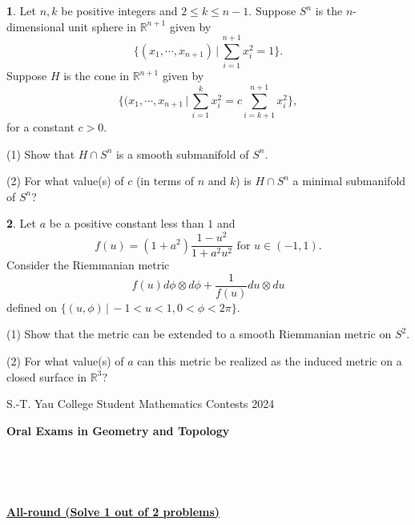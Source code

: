 \documentclass[12pt,a4paper]{amsart}
\theoremstyle{definition}
\newtheorem{problem}{}
\begin{document}
\begin{problem}
Let $n, k$ be positive integers and $2\leq k\leq n-1$. Suppose $S^n$
is the $n$-dimensional unit sphere in $\mathbb R^{n+1}$ given by
\[\{ (x_1, \cdots, x_{n+1})\,|\, \sum_{i=1}^{n+1} x_i^2=1\}.\]
Suppose $H$ is the cone in $\mathbb R^{n+1}$
 given by \[\{(x_1, \cdots, x_{n+1}\,|\,\sum_{i=1}^k x_i^2=c\sum_{i=k+1}^{n+1} x_i^2\},\] for a constant $c>0$.

(1) Show that $H\cap S^n$ is a smooth submanifold of $S^n$.

(2) For what value(s) of  $c$ (in terms of $n$ and $k$) is $H\cap
S^n$ a minimal submanifold of $S^n$?
\end{problem}



\begin{problem}
Let $a$ be a positive constant less than $1$ and
\[f(u)=(1+a^2)\frac{1-u^2}{1+a^2 u^2} \text{ for } u\in (-1, 1).\]
Consider the Riemmanian metric \[f(u)d\phi\otimes
d\phi+\frac{1}{f(u)}du\otimes du\] defined on $\{(u, \phi)\,|\,
-1<u<1, 0<\phi<2\pi\}$.

(1) Show that the metric can be extended to a smooth Riemmanian
metric on $S^2$.

(2) For what value(s) of  $a$  can this metric be realized as the
induced metric on a closed surface in $\mathbb R^3$?
\end{problem}



\newpage

\begin{center}
S.-T. Yau College Student Mathematics Contests 2024\\

\vspace{0.1cm}

\Large {\bf Oral Exams in Geometry and Topology}

\end{center}

\

\

\begin{center}
\Large \underline{\bf All-round (Solve 1 out of 2 problems)}

\end{center}

\setcounter{problem}{0} \vspace{1cm}
\end{document}
